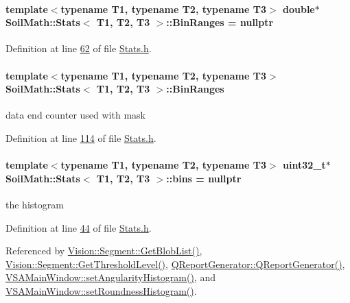 \hypertarget{class_soil_math_1_1_stats_a0d452c96b6f499f054432bd3b52d1302}{}
\paragraph[{Bin\+Ranges}]{\setlength{\rightskip}{0pt plus 5cm}template$<$typename T1, typename T2, typename T3$>$ double$\ast$ {\bf Soil\+Math\+::\+Stats}$<$ T1, T2, T3 $>$\+::Bin\+Ranges = nullptr}\label{class_soil_math_1_1_stats_a0d452c96b6f499f054432bd3b52d1302}


Definition at line \hyperlink{_stats_8h_source_l00062}{62} of file \hyperlink{_stats_8h_source}{Stats.\+h}.

\hypertarget{class_soil_math_1_1_stats_a926290338b0325a457f65d562a328e07}{}
\paragraph[{Bin\+Ranges}]{\setlength{\rightskip}{0pt plus 5cm}template$<$typename T1, typename T2, typename T3$>$ {\bf Soil\+Math\+::\+Stats}$<$ T1, T2, T3 $>$\+::Bin\+Ranges}\label{class_soil_math_1_1_stats_a926290338b0325a457f65d562a328e07}
data end counter used with mask 

Definition at line \hyperlink{_stats_8h_source_l00114}{114} of file \hyperlink{_stats_8h_source}{Stats.\+h}.

\hypertarget{class_soil_math_1_1_stats_a00778b298b1ebb335eb0c4eed69e471c}{}
\paragraph[{bins}]{\setlength{\rightskip}{0pt plus 5cm}template$<$typename T1, typename T2, typename T3$>$ {\bf uint32\+\_\+t}$\ast$ {\bf Soil\+Math\+::\+Stats}$<$ T1, T2, T3 $>$\+::bins = nullptr}\label{class_soil_math_1_1_stats_a00778b298b1ebb335eb0c4eed69e471c}
the histogram 

Definition at line \hyperlink{_stats_8h_source_l00044}{44} of file \hyperlink{_stats_8h_source}{Stats.\+h}.



Referenced by \hyperlink{_segment_8cpp_source_l00534}{Vision\+::\+Segment\+::\+Get\+Blob\+List()}, \hyperlink{_segment_8cpp_source_l00069}{Vision\+::\+Segment\+::\+Get\+Threshold\+Level()}, \hyperlink{qreportgenerator_8cpp_source_l00004}{Q\+Report\+Generator\+::\+Q\+Report\+Generator()}, \hyperlink{vsamainwindow_8cpp_source_l00315}{V\+S\+A\+Main\+Window\+::set\+Angularity\+Histogram()}, and \hyperlink{vsamainwindow_8cpp_source_l00291}{V\+S\+A\+Main\+Window\+::set\+Roundness\+Histogram()}.

